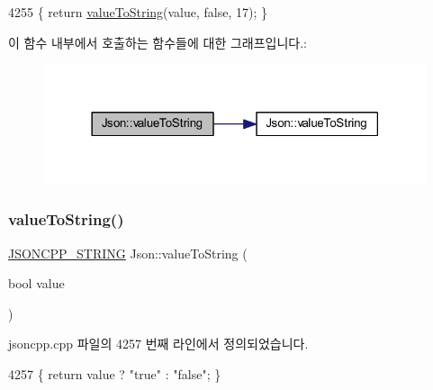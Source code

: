 \begin{DoxyCode}
4255 \{ \textcolor{keywordflow}{return} \hyperlink{namespace_json_a498503e8f49d6a3811e3c9f6757da60d}{valueToString}(value, \textcolor{keyword}{false}, 17); \}
\end{DoxyCode}
이 함수 내부에서 호출하는 함수들에 대한 그래프입니다.\+:\nopagebreak
\begin{figure}[H]
\begin{center}
\leavevmode
\includegraphics[width=318pt]{namespace_json_a3cf0c8dbbdb898c4a6fad54670b34bd1_cgraph}
\end{center}
\end{figure}
\mbox{\label{namespace_json_a0a706a1fffba4fe8a8c1ef75b2dbbfab}} 
\subsubsection{\texorpdfstring{value\+To\+String()}{valueToString()}\hspace{0.1cm}{\footnotesize\ttfamily [6/6]}}
{\footnotesize\ttfamily \hyperlink{json_8h_a1e723f95759de062585bc4a8fd3fa4be}{J\+S\+O\+N\+C\+P\+P\+\_\+\+S\+T\+R\+I\+NG} Json\+::value\+To\+String (\begin{DoxyParamCaption}\item[{bool}]{value }\end{DoxyParamCaption})}



jsoncpp.\+cpp 파일의 4257 번째 라인에서 정의되었습니다.


\begin{DoxyCode}
4257 \{ \textcolor{keywordflow}{return} value ? \textcolor{stringliteral}{"true"} : \textcolor{stringliteral}{"false"}; \}
\end{DoxyCode}
\mbox{\label{namespace_json_a00820c0084189e2a7533531c0f250e3f}} 
